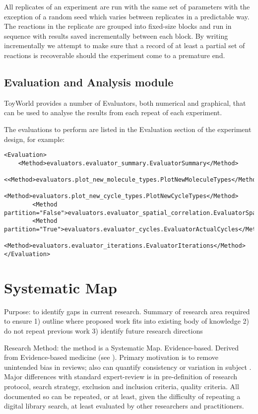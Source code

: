 All replicates of an experiment are run with the same set of parameters
with the exception of a random seed which varies between replicates in a
predictable way. The reactions in the replicate are grouped into
fixed-size blocks and run in sequence with results saved incrementally
between each block. By writing incrementally we attempt to make sure
that a record of at least a partial set of reactions is recoverable
should the experiment come to a premature end.

\section{Evaluation and Analysis module}\label{evaluation-and-analysis-module}

ToyWorld provides a number of Evaluators, both numerical and graphical,
that can be used to analyse the results from each repeat of each
experiment.

The evaluations to perform are listed in the Evaluation section of the
experiment design, for example:

\begin{verbatim}
<Evaluation>
    <Method>evaluators.evaluator_summary.EvaluatorSummary</Method>
        <<Method>evaluators.plot_new_molecule_types.PlotNewMoleculeTypes</Method>
        <Method>evaluators.plot_new_cycle_types.PlotNewCycleTypes</Method>
        <Method partition="False">evaluators.evaluator_spatial_correlation.EvaluatorSpatialCorrelation</Method>
        <Method partition="True">evaluators.evaluator_cycles.EvaluatorActualCycles</Method>
        <Method>evaluators.evaluator_iterations.EvaluatorIterations</Method>
</Evaluation>
\end{verbatim}

\chapter{Systematic Map}

Purpose: to identify gaps in current research. Summary of research area required to ensure 1) outline where proposed work fits into existing body of knowledge 2) do not repeat previous work 3) identify future research directions

Research Method: the method is a Systematic Map. Evidence-based. Derived from Evidence-based medicine (see \cite{Cochrane:2011qy, CRD:2008fj}). Primary motivation is to remove unintended bias in reviews; also can quantify consistency or variation in subject \parencite{Kitchenham:2007nx}.
Major differences with standard expert-review is in pre-definition of research protocol, search strategy, exclusion and inclusion criteria, quality criteria. All documented so can be repeated, or at least, given the difficulty of repeating a digital library search, at least evaluated by other researchers and practitioners.

